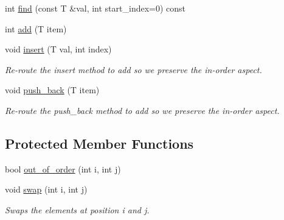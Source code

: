 \begin{DoxyCompactItemize}
int \mbox{\hyperlink{classssuds_1_1_sorted_array_list_afab18886a6a2b3114311daa7de97ec60}{find}} (const T \&val, int start\+\_\+index=0) const
\item 
int \mbox{\hyperlink{classssuds_1_1_sorted_array_list_a98d8dd6fbe58d224abea6c581a9a1398}{add}} (T item)
\item 
\mbox{\label{classssuds_1_1_sorted_array_list_aaebb285fce915b5d54801ee1cd7bbde2}} 
void \mbox{\hyperlink{classssuds_1_1_sorted_array_list_aaebb285fce915b5d54801ee1cd7bbde2}{insert}} (T val, int index)
\begin{DoxyCompactList}\small\item\em Re-\/route the insert method to add so we preserve the in-\/order aspect. \end{DoxyCompactList}\item 
\mbox{\label{classssuds_1_1_sorted_array_list_a53a43854b778c121d20c7b10c2c0ee5d}} 
void \mbox{\hyperlink{classssuds_1_1_sorted_array_list_a53a43854b778c121d20c7b10c2c0ee5d}{push\+\_\+back}} (T item)
\begin{DoxyCompactList}\small\item\em Re-\/route the push\+\_\+back method to add so we preserve the in-\/order aspect. \end{DoxyCompactList}\end{DoxyCompactItemize}
\subsection*{Protected Member Functions}
\begin{DoxyCompactItemize}
\item 
bool \mbox{\hyperlink{classssuds_1_1_sorted_array_list_a6e79261f08edc46db53858fb66443b3c}{out\+\_\+of\+\_\+order}} (int i, int j)
\item 
\mbox{\label{classssuds_1_1_sorted_array_list_a4b4e9c2c3a8e465f01805a718e25b8dd}} 
void \mbox{\hyperlink{classssuds_1_1_sorted_array_list_a4b4e9c2c3a8e465f01805a718e25b8dd}{swap}} (int i, int j)
\begin{DoxyCompactList}\small\item\em Swaps the elements at position i and j. \end{DoxyCompactList}\end{DoxyCompactItemize}
